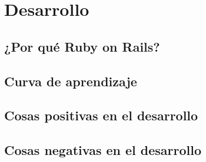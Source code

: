 
\section{Desarrollo} %
	\subsection{¿Por qué Ruby on Rails?}
	\subsection{Curva de aprendizaje}
	\subsection{Cosas positivas en el desarrollo}
	\subsection{Cosas negativas en el desarrollo}